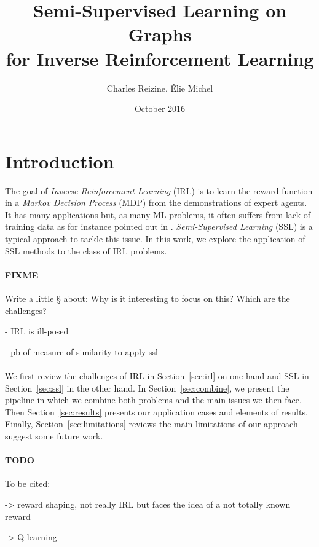 \documentclass{article}
\title{Semi-Supervised Learning on Graphs \\
for Inverse Reinforcement Learning}
\author{Charles Reizine, Élie Michel}
\date{October 2016}
\begin{document}
\maketitle

\section{Introduction}

The goal of \emph{Inverse Reinforcement Learning} (IRL) is to learn the reward function in a \emph{Markov Decision Process} (MDP) from the demonstrations of expert agents. It has many applications \cite{Kaelbling96} but, as many ML problems, it often suffers from lack of training data as for instance pointed out in \cite{Vasquez14}. \emph{Semi-Supervised Learning} (SSL) is a typical approach to tackle this issue. In this work, we explore the application of SSL methods to the class of IRL problems.

\paragraph{FIXME}
Write a little § about:
Why is it interesting to focus on this?
Which are the challenges?

 - IRL is ill-posed

 - pb of measure of similarity to apply ssl

\paragraph{}
We first review the challenges of IRL in Section~\ref{sec:irl} on one hand and SSL in Section~\ref{sec:ssl} in the other hand. In Section~\ref{sec:combine}, we present the pipeline in which we combine both problems and the main issues we then face. Then Section~\ref{sec:results} presents our application cases and elements of results. Finally, Section~\ref{sec:limitations} reviews the main limitations of our approach suggest some future work.


\paragraph{TODO} To be cited:

\cite{Ng99} -> reward shaping, not really IRL but faces the idea of a not totally known reward

\cite{Abbeel04}

\cite{Watkins92} -> Q-learning
\end{document}
